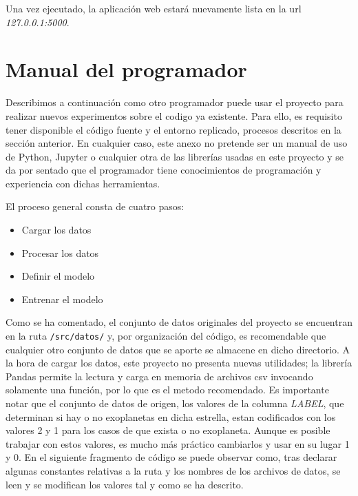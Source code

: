 Una vez ejecutado, la aplicación web estará nuevamente lista en la url \textit{127.0.0.1:5000}.

\section{Manual del programador}

Describimos a continuación como otro programador puede usar el proyecto para realizar nuevos experimentos sobre el codigo ya existente. Para ello, es requisito tener disponible el código fuente y el entorno replicado, procesos descritos en la sección anterior. En cualquier caso, este anexo no pretende ser un manual de uso de Python, Jupyter o cualquier otra de las librerías usadas en este proyecto y se da por sentado que el programador tiene conocimientos de programación y experiencia con dichas herramientas.

El proceso general consta de cuatro pasos:

\begin{itemize}
    \item Cargar los datos
    \item Procesar los datos
    \item Definir el modelo
    \item Entrenar el modelo
\end{itemize}

Como se ha comentado, el conjunto de datos originales del proyecto se encuentran en la ruta \texttt{/src/datos/} y, por organización del código, es recomendable que cualquier otro conjunto de datos que se aporte se almacene en dicho directorio. A la hora de cargar los datos, este proyecto no presenta nuevas utilidades; la librería Pandas permite la lectura y carga en memoria de archivos csv invocando solamente una función, por lo que es el metodo recomendado. Es importante notar que el conjunto de datos de origen, los valores de la columna \textit{LABEL}, que determinan si hay o no exoplanetas en dicha estrella, estan codificados con los valores 2 y 1 para los casos de que exista o no exoplaneta. Aunque es posible trabajar con estos valores, es mucho más práctico cambiarlos y usar en su lugar 1 y 0. En el siguiente fragmento de código se puede observar como, tras declarar algunas constantes relativas a la ruta y los nombres de los archivos de datos, se leen y se modifican los valores tal y como se ha descrito.


